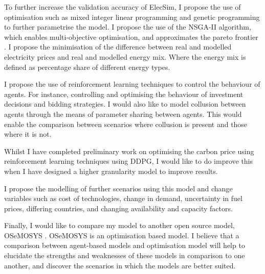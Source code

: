\documentclass[12pt]{article}
\begin{document}
To further increase the validation accuracy of ElecSim, I propose the use of optimisation such as mixed integer linear programming and genetic programming to further parametrise the model. I propose the use of the NSGA-II algorithm, which enables multi-objective optimisation, and approximates the pareto frontier \cite{Valkanas2014}. I propose the minimisation of the difference between real and modelled electricity prices and real and modelled energy mix. Where the energy mix is defined as percentage share of different energy types.

I propose the use of reinforcement learning techniques to control the behaviour of agents. For instance, controlling and optimising the behaviour of investment decisions and bidding strategies. I would also like to model collusion between agents through the means of parameter sharing between agents. This would enable the comparison between scenarios where collusion is present and those where it is not.

Whilst I have completed preliminary work on optimising the carbon price using reinforcement learning techniques using DDPG, I would like to do improve this when I have designed a higher granularity model to improve results.

I propose the modelling of further scenarios using this model and change variables such as cost of technologies, change in demand, uncertainty in fuel prices, differing countries, and changing availability and capacity factors.

Finally, I would like to compare my model to another open source model, OSeMOSYS \cite{Howells2011}. OSeMOSYS is an optimisation based model. I believe that a comparison between agent-based models and optimisation model will help to elucidate the strengths and weaknesses of these models in comparison to one another, and discover the scenarios in which the models are better suited. 
\end{document}
